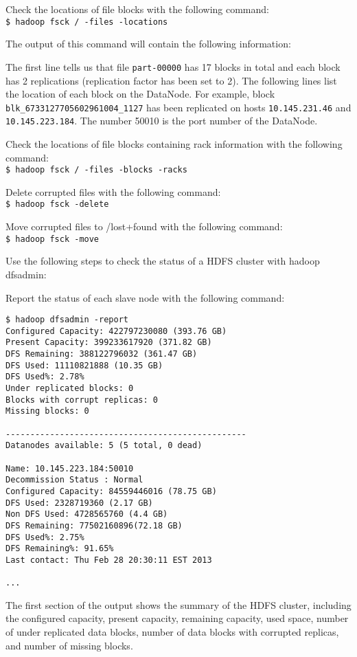 Check the locations of file blocks with the following command: \\
\verb|$ hadoop fsck / -files -locations|

The output of this command will contain the following information:

The first line tells us that file \verb|part-00000| has 17 blocks in total and each block has 2 replications (replication factor has been set to 2). The following lines list the location of each block on the DataNode. For example, block \verb|blk_6733127705602961004_1127| has been replicated on hosts \verb|10.145.231.46| and \verb|10.145.223.184|. The number 50010 is the port number of the DataNode.

Check the locations of file blocks containing rack information with the following command: \\
\verb|$ hadoop fsck / -files -blocks -racks|

Delete corrupted files with the following command:\\
\verb|$ hadoop fsck -delete|

Move corrupted files to /lost+found with the following command: \\
\verb|$ hadoop fsck -move|

Use the following steps to check the status of a HDFS cluster with hadoop dfsadmin:

Report the status of each slave node with the following command: 
\begin{verbatim}
$ hadoop dfsadmin -report
Configured Capacity: 422797230080 (393.76 GB)
Present Capacity: 399233617920 (371.82 GB)
DFS Remaining: 388122796032 (361.47 GB)
DFS Used: 11110821888 (10.35 GB)
DFS Used%: 2.78%
Under replicated blocks: 0
Blocks with corrupt replicas: 0
Missing blocks: 0

-------------------------------------------------
Datanodes available: 5 (5 total, 0 dead)

Name: 10.145.223.184:50010
Decommission Status : Normal
Configured Capacity: 84559446016 (78.75 GB)
DFS Used: 2328719360 (2.17 GB)
Non DFS Used: 4728565760 (4.4 GB)
DFS Remaining: 77502160896(72.18 GB)
DFS Used%: 2.75%
DFS Remaining%: 91.65%
Last contact: Thu Feb 28 20:30:11 EST 2013

...

\end{verbatim}

The first section of the output shows the summary of the HDFS cluster, including the configured capacity, present capacity, remaining capacity, used space, number of under replicated data blocks, number of data blocks with corrupted replicas, and number of missing blocks.


